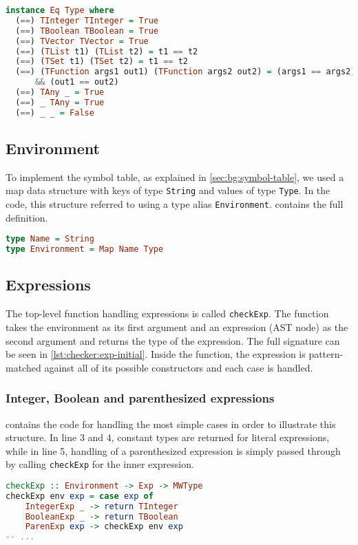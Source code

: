 \begin{lstlisting}[language=haskell,
caption={Custom \lstinline{Eq} instance for \lstinline{Type}},
label=lst:checker:type-eq]
instance Eq Type where
  (==) TInteger TInteger = True
  (==) TBoolean TBoolean = True
  (==) TVector TVector = True
  (==) (TList t1) (TList t2) = t1 == t2
  (==) (TSet t1) (TSet t2) = t1 == t2
  (==) (TFunction args1 out1) (TFunction args2 out2) = (args1 == args2)
      && (out1 == out2)
  (==) TAny _ = True
  (==) _ TAny = True
  (==) _ _ = False
\end{lstlisting}

\subsection{Environment}
To implement the symbol table, as explained in \cref{sec:bg:symbol-table}, we used a map data structure with keys of type \lstinline{String} and values of type \lstinline{Type}. In the code, this structure referred to using a type alias \lstinline{Environment}.  contains the full definition.
\begin{lstlisting}[language=haskell, numbers=none,
caption={\lstinline{Environment} data structure (type alias)},
label=lst:checker:environment]
type Name = String
type Environment = Map Name Type
\end{lstlisting}

\subsection{Expressions}
The top-level function handling expressions is called \lstinline{checkExp}. The function takes the environment as its first argument and an expression (AST node) as the second argument and returns the type of the expression. The full signature can be seen in \cref{lst:checker:exp-initial}. Inside the function, the expression is pattern-matched against all of its possible constructors and each case is handled.
\subsubsection{Integer, Boolean and parenthesized expressions}
 contains the code for handling the most simple cases in order to illustrate this structure. In line 3 and 4, constant types are returned for literal expressions, while in line 5, handling of a parenthesized expression is simply passed through by calling \lstinline{checkExp} for the inner expression.
\begin{lstlisting}[language=haskell,
caption={Portion of \lstinline{checkExp} that handles constant and parenthesized expressions},
label=lst:checker:exp-initial]
checkExp :: Environment -> Exp -> MWType
checkExp env exp = case exp of
    IntegerExp _ -> return TInteger
    BooleanExp _ -> return TBoolean
    ParenExp exp -> checkExp env exp
-- ...
\end{lstlisting}

